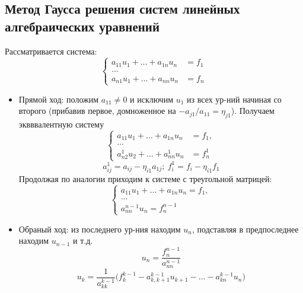 \documentclass[a4paper]{article}
\begin{document}
\subsection{Метод Гаусса решения систем линейных алгебраических уравнений}
Рассматривается система:
$$
\begin{cases}
	a_{11}u_1 + \ldots + a_{1n}u_n &= f_1 \\
	\ldots \\
	a_{n1}u_1 + \ldots + a_{nn}u_n &= f_n 
\end{cases} $$
\begin{itemize}
	\item Прямой ход: положим $a_{11} \neq 0$ и исключим $u_1$ из всех ур-ний начиная со второго (прибавив первое, домноженное на $-a_{j1}/a_{11} = \eta_{j1}$). Получаем эквввалентную систему
	$$\begin{cases}
		a_{11}u_1 + \ldots + a_{1n}u_n &= f_1,\\
		\ldots \\
		a_{n2}^1 u_2 + \ldots + a_{nn}^1u_n &= f_n^1
	\end{cases}$$ 
	$$
	a_{ij}^1 = a_{ij} - \eta_{i1}a_{1j} ; \ f_i^1 = f_i - \eta_{i1}f_1
	$$
Продолжая по аналогии приходим к системе с треугольной матрицей:
$$\begin{cases}
		a_{11}u_1 + \ldots + a_{1n}u_n = f_1,\\
		\ldots \\
		a_{nn}^{n-1} u_n = f_n^{n-1}
	\end{cases}$$
	\item Обраный ход: из последнего ур-ния находим $u_n$, подставляя в предпоследнее находим $u_{n-1}$ и т.д.
	$$u_n = \frac{f_n^{n-1}}{a_{nn}^{n-1}} $$
	$$u_k = \frac{1}{a_{kk}^{k-1}} \big( f_k^{k-1} - a_{k,k+1}^{k-1}u_{k+1} - \ldots - a_{kn}^{k-1}u_n \big) $$ 
\end{itemize}
\end{document}
